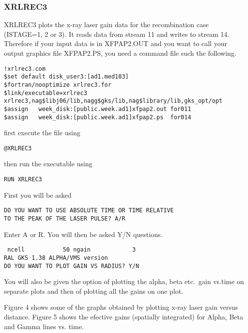 \subsubsection{XRLREC3}
XRLREC3 plots the x-ray laser gain data for the recombination case (ISTAGE=1, 2 or 3). It reads data from stream 11
and writes to stream 14. 
Therefore if your input data is in
XFPAP2.OUT 
and you want to call your output graphics file XFPAP2.PS,
you need a command file such the following.
\begin{verbatim}
!xrlrec3.com
$set default disk_user3:[ad1.med103]
$fortran/nooptimize xrlrec3.for
$link/executable=xrlrec3 xrlrec3,nag$libj06/lib,nagg$gks/lib,nag$library/lib,gks_opt/opt
$assign   week_disk:[public.week.ad1]xfpap2.out for011
$assign   week_disk:[public.week.ad1]xfpap2.ps  for014
\end{verbatim}
first execute the file using
\begin{verbatim}
@XRLREC3
\end{verbatim}
then run the executable using
\begin{verbatim}
RUN XRLREC3
\end{verbatim}
First you will be asked
\begin{verbatim}
DO YOU WANT TO USE ABSOLUTE TIME OR TIME RELATIVE
TO THE PEAK OF THE LASER PULSE? A/R
\end{verbatim}
Enter A or R. You will then be asked Y/N questions.
\begin{verbatim}
 ncell           50 ngain            3
RAL GKS 1.38 ALPHA/VMS version
DO YOU WANT TO PLOT GAIN VS RADIUS? Y/N
\end{verbatim}
You will also be given the option of plotting the alpha, beta
etc.\ gain vs.\. time on separate plots  and then of plotting
all the gains on one plot.

Figure 4 shows some of the graphs obtained by plotting x-ray laser gain versus distance. Figure 5 shows 
the efective gains (spatially integrated) for Alpha, Beta and Gamma lines vs. time.


